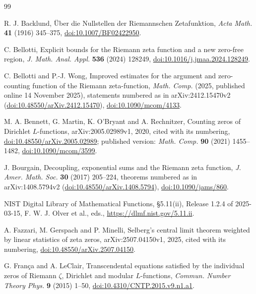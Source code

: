 \documentclass[11pt,a4paper]{article}
\numberwithin{equation}{section}
\theoremstyle{definition}
\theoremstyle{remark}
\begin{document}
\begin{thebibliography}{99}

 R. J. Backlund, \"Uber die Nullstellen der Riemannschen Zetafunktion, \textit{Acta Math.} \textbf{41} (1916) 345--375, \href{https://doi.org/10.1007/BF02422950}{doi:10.1007/BF02422950}.

 C. Bellotti, Explicit bounds for the Riemann zeta function and a new zero-free region, \textit{J. Math. Anal. Appl.} \textbf{536} (2024) 128249, \href{https://doi.org/10.1016/j.jmaa.2024.128249}{doi:10.1016/j.jmaa.2024.128249}.

 C. Bellotti and P.-J. Wong, Improved estimates for the argument and zero-counting function of the Riemann zeta-function, \textit{Math. Comp.} (2025, published online 14 November 2025), statements numbered as in arXiv:2412.15470v2 (\href{https://doi.org/10.48550/arXiv.2412.15470}{doi:10.48550/arXiv.2412.15470}), \href{https://doi.org/10.1090/mcom/4133}{doi:10.1090/mcom/4133}.

 M. A. Bennett, G. Martin, K. O'Bryant and A. Rechnitzer, Counting zeros of Dirichlet $L$-functions, arXiv:2005.02989v1, 2020, cited with its numbering, \href{https://doi.org/10.48550/arXiv.2005.02989}{doi:10.48550/arXiv.2005.02989}; published version: \textit{Math. Comp.} \textbf{90} (2021) 1455--1482, \href{https://doi.org/10.1090/mcom/3599}{doi:10.1090/mcom/3599}.

 J. Bourgain, Decoupling, exponential sums and the Riemann zeta function, \textit{J. Amer. Math. Soc.} \textbf{30} (2017) 205--224, theorems numbered as in arXiv:1408.5794v2 (\href{https://doi.org/10.48550/arXiv.1408.5794}{doi:10.48550/arXiv.1408.5794}), \href{https://doi.org/10.1090/jams/860}{doi:10.1090/jams/860}.

 NIST Digital Library of Mathematical Functions, \S5.11(ii), Release 1.2.4 of 2025-03-15, F. W. J. Olver et al., eds., \url{https://dlmf.nist.gov/5.11.ii}.

 A. Fazzari, M. Gerspach and P. Minelli, Selberg's central limit theorem weighted by linear statistics of zeta zeros, arXiv:2507.04150v1, 2025, cited with its numbering, \href{https://doi.org/10.48550/arXiv.2507.04150}{doi:10.48550/arXiv.2507.04150}.

 G. Fran\c{c}a and A. LeClair, Transcendental equations satisfied by the individual zeros of Riemann $\zeta$, Dirichlet and modular $L$-functions, \textit{Commun. Number Theory Phys.} \textbf{9} (2015) 1--50, \href{https://doi.org/10.4310/CNTP.2015.v9.n1.a1}{doi:10.4310/CNTP.2015.v9.n1.a1}.


\end{thebibliography}
\end{document}

